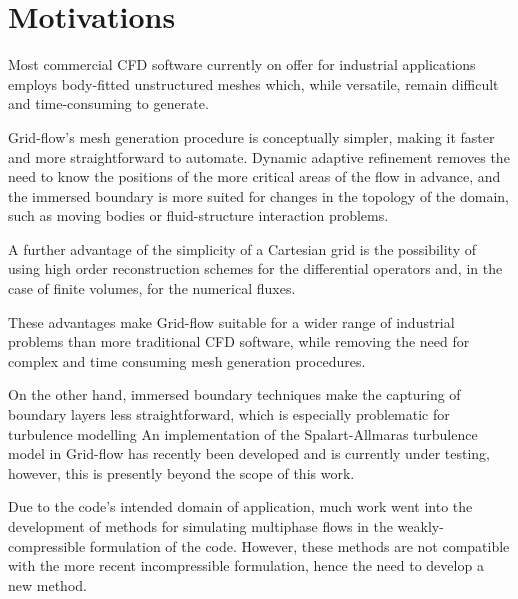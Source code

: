 \documentclass[11pt, a4paper, oneside, openany]{book}
\begin{document}
\section{Motivations}\label{Chapter_Introduction_Section_Motivations}
Most commercial CFD software currently on offer for industrial applications employs body-fitted unstructured meshes which, while versatile, remain difficult and time-consuming to generate.\par
Grid-flow's mesh generation procedure is conceptually simpler, making it faster and more straightforward to automate. Dynamic adaptive refinement removes the need to know the positions of the more critical areas of the flow in advance, and the immersed boundary is more suited for changes in the topology of the domain, such as moving bodies or fluid-structure interaction problems.\par
A further advantage of the simplicity of a Cartesian grid is the possibility of using high order reconstruction schemes for the differential operators and, in the case of finite volumes, for the numerical fluxes.\par
These advantages make Grid-flow suitable for a wider range of industrial problems than more traditional CFD software, while removing the need for complex and time consuming mesh generation procedures.\par
On the other hand, immersed boundary techniques make the capturing of boundary layers less straightforward, which is especially problematic for turbulence modelling An implementation of the Spalart-Allmaras turbulence model in Grid-flow has recently been developed and is currently under testing, however, this is presently beyond the scope of this work.\par
Due to the code's intended domain of application, much work went into the development of methods for simulating multiphase flows in the weakly-compressible formulation of the code. However, these methods are not compatible with the more recent incompressible formulation, hence the need to develop a new method.
\end{document}
